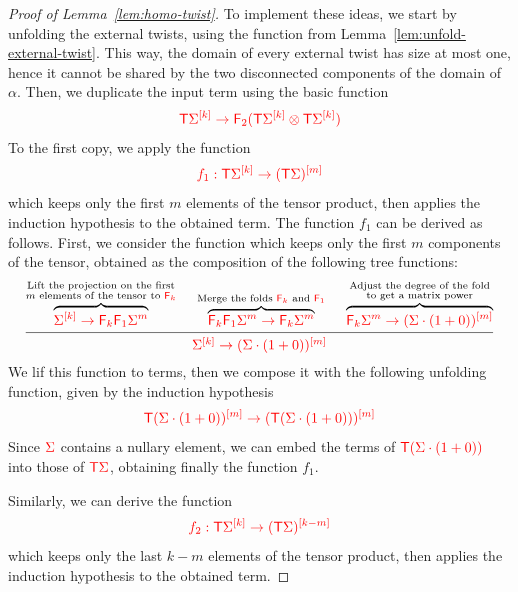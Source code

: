 \begin{proof}[Proof of Lemma~\ref{lem:homo-twist}]
\smallskip
To implement these ideas, we start by unfolding the external twists, using the function from Lemma~\ref{lem:unfold-external-twist}. This way, the domain of every external twist has size at most one,  hence it cannot be shared by the two disconnected components of the domain of $\alpha$.
Then, we duplicate the input term using the basic function 
\begin{align*}
\ranked{\tmonad \mati k \Sigma\to \reduce 2 (\tmonad \mati k \Sigma\otimes \tmonad \mati k \Sigma)}
\end{align*}
To the first copy, we apply the function  
\begin{align*}
\ranked{f_1:\tmonad \mati k \Sigma \to \mati m {(\tmonad \Sigma)}}
\end{align*}
which keeps only the first $m$ elements of the tensor product, then applies the induction hypothesis to the obtained term. The function $f_1$ can be derived as follows. First, we consider the function which keeps only the first $m$ components of the tensor, obtained as the composition of the following tree functions:
\begin{align*}
\begin{prooftree}
\Hypo{\overbrace{\ranked{\mati k \Sigma \to \reduce k \reduce 1 \Sigma^m}}^{\substack{\text{Lift the projection on the first}\\\text{$m$ elements of the tensor to $\reduce k$}}}}
\Hypo{\overbrace{\ranked{\reduce k \reduce 1 \Sigma^m \to \reduce k \Sigma^m}}^{\substack{\text{Merge the folds $\reduce k$ and $\reduce 1$}}}}
\Hypo{\overbrace{\ranked{\reduce k \Sigma^m \to \mati m {(\Sigma\cdot (1+0))}}}^{\substack{\text{Adjust the degree of the fold}\\\text{to get a matrix power}}}}
\Infer{3}[]{\ranked{\mati k \Sigma \to \mati m {(\Sigma\cdot (1+0))}}}
\end{prooftree}
\end{align*}
We lif this function to terms, then we compose it with the following unfolding function, given by the induction hypothesis
\begin{align*}
\ranked{\tmonad \mati m {(\Sigma\cdot (1+0))} \to \mati m {(\tmonad (\Sigma\cdot (1+0)))}}
\end{align*}
Since $\rSigma$ contains a nullary element, we can embed the terms of  $\ranked{\tmonad (\Sigma\cdot (1+0))}$ into those of $\ranked{\tmonad \Sigma}$, obtaining finally the function $f_1$.

Similarly, we can derive the function
\begin{align*}
\ranked{f_2:\tmonad \mati k \Sigma \to \mati {k-m} {(\tmonad \Sigma)}}
\end{align*}
which keeps only the last $k-m$ elements of the tensor product, then applies the induction hypothesis to the obtained term.


\end{proof}
